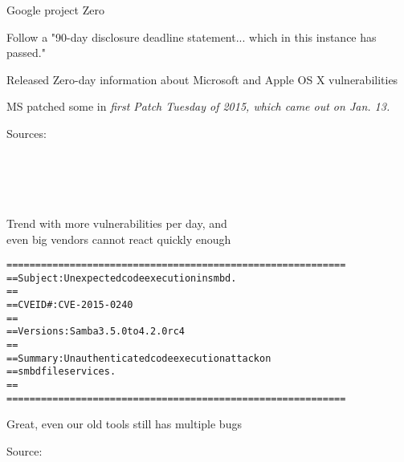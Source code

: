 \documentclass[20pt,landscape,a4paper,footrule]{foils}
\begin{document}

\begin{list1}
\item Google project Zero
\item Follow a
"90-day disclosure deadline statement... which in this instance has passed."
\item Released Zero-day information about Microsoft and Apple OS X vulnerabilities
\item MS patched some in \emph{first Patch Tuesday of 2015, which came out on Jan. 13.}
\end{list1}

Sources:\\
{\tiny
{}\\
\\
\\
\\
}

Trend with more vulnerabilities per day, and\\
even big vendors cannot react quickly enough




\begin{alltt}\small
  ===========================================================
  == Subject:     Unexpected code execution in smbd.
  ==
  == CVE ID#:     CVE-2015-0240
  ==
  == Versions:    Samba 3.5.0 to 4.2.0rc4
  ==
  == Summary:     Unauthenticated code execution attack on
  ==		smbd file services.
  ==
  ===========================================================
\end{alltt}

\centerline{Great, even our old tools still has multiple bugs}

Source:\\





\end{document}
